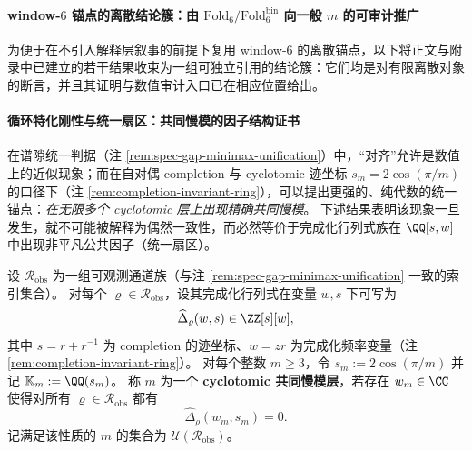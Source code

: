 \paragraph{window-\(6\) 锚点的离散结论簇：由 \texorpdfstring{$\mathrm{Fold}_6/\mathrm{Fold}^{\mathrm{bin}}_6$}{Fold6/Foldbin6} 向一般 \texorpdfstring{$m$}{m} 的可审计推广}
为便于在不引入解释层叙事的前提下复用 window-\(6\) 的离散锚点，以下将正文与附录中已建立的若干结果收束为一组可独立引用的结论簇：它们均是对有限离散对象的断言，并且其证明与数值审计入口已在相应位置给出。



\paragraph{循环特化刚性与统一扇区：共同慢模的因子结构证书}
在谱隙统一判据（注 \ref{rem:spec-gap-minimax-unification}）中，“对齐”允许是数值上的近似现象；而在自对偶 completion 与 cyclotomic 迹坐标 \(s_m=2\cos(\pi/m)\) 的口径下（注 \ref{rem:completion-invariant-ring}），可以提出更强的、纯代数的统一锚点：\emph{在无限多个 cyclotomic 层上出现精确共同慢模}。
下述结果表明该现象一旦发生，就不可能被解释为偶然一致性，而必然等价于完成化行列式族在 \(\QQ[s,w]\) 中出现非平凡公共因子（统一扇区）。

\begin{definition}\label{def:cyclotomic-common-slowmode-layer}
设 \(\mathcal{R}_{\mathrm{obs}}\) 为一组可观测通道族（与注 \ref{rem:spec-gap-minimax-unification} 一致的索引集合）。
对每个 \(\varrho\in\mathcal{R}_{\mathrm{obs}}\)，设其完成化行列式在变量 \(w,s\) 下可写为
\[
\widehat{\Delta}_{\varrho}(w,s)\in\ZZ[s][w],
\]
其中 \(s=r+r^{-1}\) 为 completion 的迹坐标、\(w=zr\) 为完成化频率变量（注 \ref{rem:completion-invariant-ring}）。
对每个整数 \(m\ge 3\)，令 \(s_m:=2\cos(\pi/m)\) 并记 \(\mathbb{K}_m:=\QQ(s_m)\)。
称 \(m\) 为一个 \textbf{cyclotomic 共同慢模层}，若存在 \(w_m\in\CC\) 使得对所有 \(\varrho\in\mathcal{R}_{\mathrm{obs}}\) 都有
\[
\widehat{\Delta}_{\varrho}(w_m,s_m)=0.
\]
记满足该性质的 \(m\) 的集合为 \(\mathcal{U}(\mathcal{R}_{\mathrm{obs}})\)。
\end{definition}


